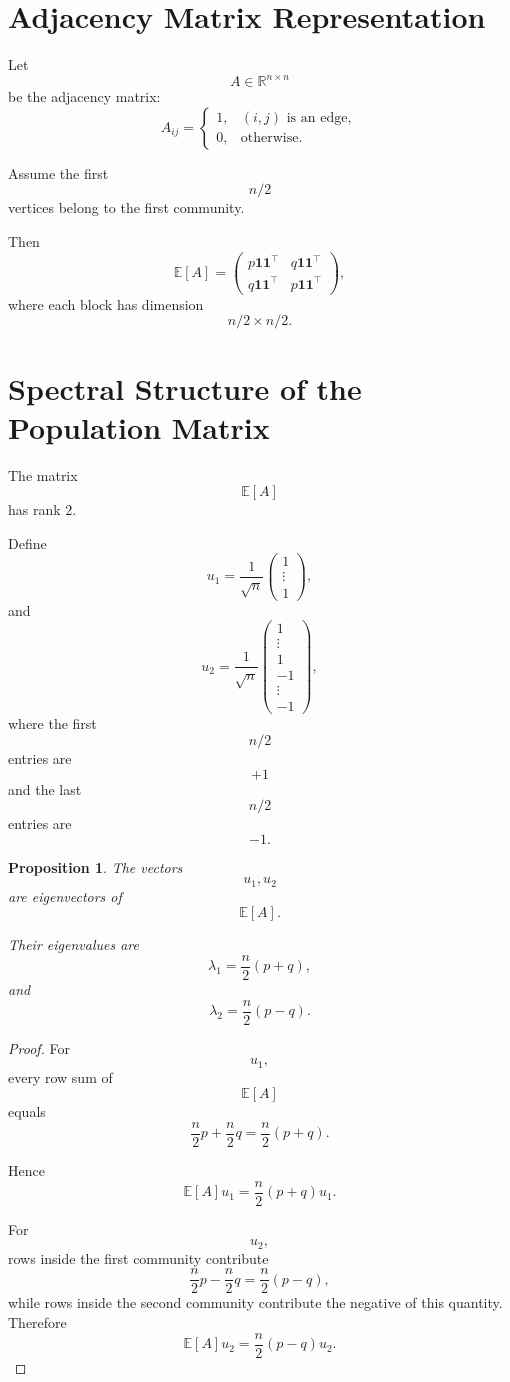 \documentclass[12pt,oneside]{book}
\numberwithin{equation}{section}
\theoremstyle{definition}
\theoremstyle{plain}
\newtheorem{proposition}{Proposition}[section]
\theoremstyle{remark}
\newcommand{\R}{\mathbb{R}}
\newcommand{\E}{\mathbb{E}}
\begin{document}
\section{Adjacency Matrix Representation}

Let
\[
A\in\R^{n\times n}
\]
be the adjacency matrix:
\[
A_{ij}
=
\begin{cases}
1, & (i,j)\text{ is an edge},\\
0, & \text{otherwise}.
\end{cases}
\]

Assume the first
\[
n/2
\]
vertices belong to the first community.

Then
\[
\E[A]
=
\begin{pmatrix}
p\mathbf{1}\mathbf{1}^\top & q\mathbf{1}\mathbf{1}^\top\\
q\mathbf{1}\mathbf{1}^\top & p\mathbf{1}\mathbf{1}^\top
\end{pmatrix},
\]
where each block has dimension
\[
n/2\times n/2.
\]

\section{Spectral Structure of the Population Matrix}

The matrix
\[
\E[A]
\]
has rank $2$.

Define
\[
u_1
=
\frac{1}{\sqrt{n}}
\begin{pmatrix}
1\\
\vdots\\
1
\end{pmatrix},
\]
and
\[
u_2
=
\frac{1}{\sqrt{n}}
\begin{pmatrix}
1\\
\vdots\\
1\\
-1\\
\vdots\\
-1
\end{pmatrix},
\]
where the first
\[
n/2
\]
entries are
\[
+1
\]
and the last
\[
n/2
\]
entries are
\[
-1.
\]

\begin{proposition}
The vectors
\[
u_1,u_2
\]
are eigenvectors of
\[
\E[A].
\]

Their eigenvalues are
\[
\lambda_1
=
\frac{n}{2}(p+q),
\]
and
\[
\lambda_2
=
\frac{n}{2}(p-q).
\]
\end{proposition}

\begin{proof}
For
\[
u_1,
\]
every row sum of
\[
\E[A]
\]
equals
\[
\frac{n}{2}p+\frac{n}{2}q
=
\frac{n}{2}(p+q).
\]

Hence
\[
\E[A]u_1
=
\frac{n}{2}(p+q)u_1.
\]

For
\[
u_2,
\]
rows inside the first community contribute
\[
\frac{n}{2}p-\frac{n}{2}q
=
\frac{n}{2}(p-q),
\]
while rows inside the second community contribute the negative of this quantity. Therefore
\[
\E[A]u_2
=
\frac{n}{2}(p-q)u_2.
\]
\end{proof}
\end{document}
